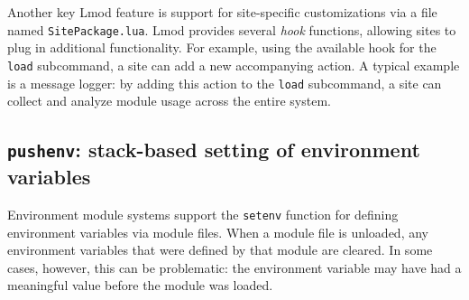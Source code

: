 Another key Lmod feature is support for site-specific 
customizations via
a file named \texttt{\small SitePackage.lua}. Lmod provides several
\emph{hook} functions, allowing sites to plug in additional functionality.
For example, using the available hook for the \texttt{\small load} subcommand, a
site can add a new accompanying action. A typical example is a message logger: by
adding this action to the \texttt{\small load} subcommand, a site can collect and
analyze module usage across the entire system.


\subsection{\texttt{\small pushenv}: stack-based setting of environment variables}
\label{sec:lmod_pushenv}

Environment module systems support the \texttt{\small setenv} function for 
defining environment variables via module files. When a module file is unloaded,
any environment variables that were defined by that module are cleared. In some
cases, however, this can be problematic: the environment variable may have had a
meaningful value before the module was loaded.

